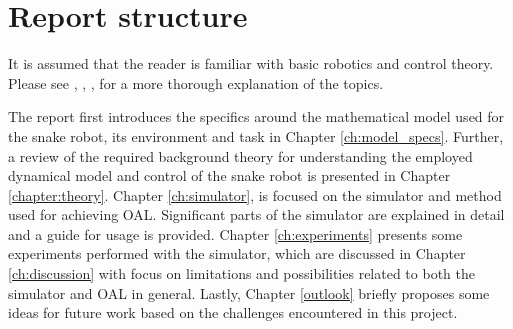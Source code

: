\section{Report structure}
It is assumed that the reader is familiar with basic robotics and control theory. Please see \cite{lynch2017modern}, \cite{lynch2017modernCompTorque}, \cite{waldron2016kinematics}, \cite{liljeback2012snake} for a more thorough explanation of the topics.

The report first introduces the specifics around the mathematical model used for the snake robot, its environment and task in Chapter \ref{ch:model_specs}. Further, a review of the required background theory for understanding the employed dynamical model and control of the snake robot is presented in Chapter \ref{chapter:theory}. Chapter \ref{ch:simulator}, is focused on the simulator and method used for achieving OAL. Significant parts of the simulator are explained in detail and a guide for usage is provided. Chapter \ref{ch:experiments} presents some experiments performed with the simulator, which are discussed in Chapter \ref{ch:discussion} with focus on limitations and possibilities related to both the simulator and OAL in general. Lastly, Chapter \ref{outlook} briefly proposes some ideas for future work based on the challenges encountered in this project.